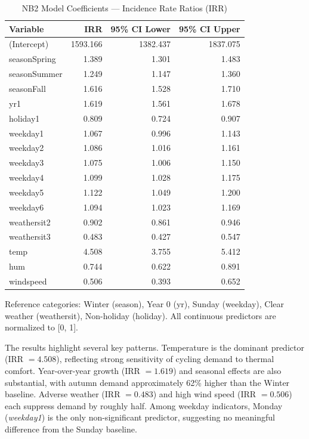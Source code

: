 \documentclass[12pt, a4paper]{article}
\begin{document}
\begin{table}[h]
\centering
\caption{NB2 Model Coefficients — Incidence Rate Ratios (IRR)}
\label{tab:nb2_irr}
\begin{tabular}{lrrr}
\hline
\textbf{Variable} & \textbf{IRR} & \textbf{95\% CI Lower} & \textbf{95\% CI Upper} \\
\hline
(Intercept)    & 1593.166 & 1382.437 & 1837.075 \\
seasonSpring   & 1.389    & 1.301    & 1.483    \\
seasonSummer   & 1.249    & 1.147    & 1.360    \\
seasonFall     & 1.616    & 1.528    & 1.710    \\
yr1            & 1.619    & 1.561    & 1.678    \\
holiday1       & 0.809    & 0.724    & 0.907    \\
weekday1       & 1.067    & 0.996    & 1.143    \\
weekday2       & 1.086    & 1.016    & 1.161    \\
weekday3       & 1.075    & 1.006    & 1.150    \\
weekday4       & 1.099    & 1.028    & 1.175    \\
weekday5       & 1.122    & 1.049    & 1.200    \\
weekday6       & 1.094    & 1.023    & 1.169    \\
weathersit2    & 0.902    & 0.861    & 0.946    \\
weathersit3    & 0.483    & 0.427    & 0.547    \\
temp           & 4.508    & 3.755    & 5.412    \\
hum            & 0.744    & 0.622    & 0.891    \\
windspeed      & 0.506    & 0.393    & 0.652    \\
\hline
\end{tabular}
\begin{tablenotes}
\small
\item Reference categories: Winter (season), Year 0 (yr), Sunday (weekday),
      Clear weather (weathersit), Non-holiday (holiday).
      All continuous predictors are normalized to [0, 1].
\end{tablenotes}
\end{table}

The results highlight several key patterns. Temperature is the dominant 
predictor (IRR $= 4.508$), reflecting strong sensitivity of cycling demand 
to thermal comfort. Year-over-year growth (IRR $= 1.619$) and seasonal 
effects are also substantial, with autumn demand approximately 62\% higher 
than the Winter baseline. Adverse weather (IRR $= 0.483$) and high wind 
speed (IRR $= 0.506$) each suppress demand by roughly half. Among weekday 
indicators, Monday (\textit{weekday1}) is the only non-significant predictor, 
suggesting no meaningful difference from the Sunday baseline.
\end{document}
